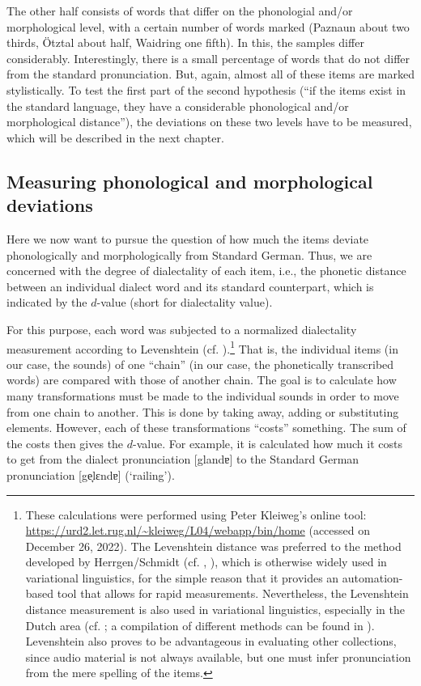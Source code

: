 \documentclass[output=paper]{langscibook}
\begin{document}
The other half consists of words that differ on the phonologial and/or morphological level, with a certain number of words marked (Paznaun about two thirds, Ötztal about half, Waidring one fifth). In this, the samples differ considerably. Interestingly, there is a small percentage of words that do not differ from the standard pronunciation. But, again, almost all of these items are marked stylistically. To test the first part of the second hypothesis (“if the items exist in the standard language, they have a considerable phonological and/or morphological distance”), the deviations on these two levels have to be measured, which will be described in the next chapter.

\subsection{Measuring phonological and morphological deviations}
\label{sec:kathrein:5.2}
Here we now want to pursue the question of how much the items deviate phonologically and morphologically from Standard German. Thus, we are concerned with the degree of dialectality of each item, i.e., the phonetic distance between an individual dialect word and its standard counterpart, which is indicated by the $d$-value (short for dialectality value).

For this purpose, each word was subjected to a normalized dialectality measurement according to Levenshtein (cf. \citealt{Heeringa2004}).\footnote{These calculations were performed using Peter Kleiweg’s online tool: \url{https://urd2.let.rug.nl/~kleiweg/L04/webapp/bin/home} (accessed on December 26, 2022). The Levenshtein distance was preferred to the method developed by Herrgen/Schmidt (cf. \citealt{HerrgenSchmidt1989}, \citealt{Lameli2004}), which is otherwise widely used in variational linguistics, for the simple reason that it provides an automation-based tool that allows for rapid measurements. Nevertheless, the Levenshtein distance measurement is also used in variational linguistics, especially in the Dutch area (cf. \citealt{GooskensHeeringa2004}; a compilation of different methods can be found in \citealt{NerbonneHeeringa2009}). Levenshtein also proves to be advantageous in evaluating other collections, since audio material is not always available, but one must infer pronunciation from the mere spelling of the items.} That is, the individual items (in our case, the sounds) of one “chain” (in our case, the phonetically transcribed words) are compared with those of another chain. The goal is to calculate how many transformations must be made to the individual sounds in order to move from one chain to another. This is done by taking away, adding or substituting elements. However, each of these transformations “costs” something. The sum of the costs then gives the $d$-value. For example, it is calculated how much it costs to get from the dialect pronunciation [glandɐ] to the Standard German pronunciation [ge̞lɛndɐ] (‘railing’).
\end{document}
